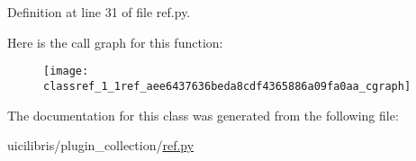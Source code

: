 \-Definition at line 31 of file ref.\-py.



\-Here is the call graph for this function\-:
\nopagebreak
\begin{figure}[H]
\begin{center}
\leavevmode
\texttt{[image: classref\_1\_1ref\_aee6437636beda8cdf4365886a09fa0aa\_cgraph]}
\end{center}
\end{figure}




\-The documentation for this class was generated from the following file\-:\begin{DoxyCompactItemize}
\item 
uicilibris/plugin\-\_\-collection/\hyperlink{ref_8py}{ref.\-py}\end{DoxyCompactItemize}

